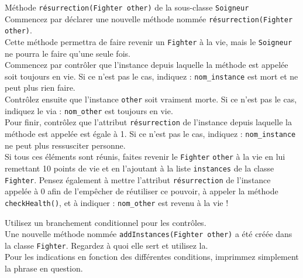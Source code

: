 \begin{Exercice}[10 minutes] Méthode \lstinline{résurrection(Fighter other)} de la sous-classe \lstinline{Soigneur} \\

Commencez par déclarer une nouvelle méthode nommée \lstinline{résurrection(Fighter other)}. \\
Cette méthode permettra de faire revenir un \lstinline{Fighter} à la vie, mais le \lstinline{Soigneur} ne pourra le faire qu'une seule fois. \\

Commencez par contrôler que l'instance depuis laquelle la méthode est appelée soit toujours en vie. Si ce n'est pas le cas, indiquez : \lstinline{nom_instance} est mort et ne peut plus rien faire.  \\ 

Contrôlez ensuite que l'instance \lstinline{other} soit vraiment morte. Si ce n'est pas le cas, indiquez le via : \lstinline{nom_other} est toujours en vie. \\

Pour finir, contrôlez que l'attribut \lstinline{résurrection} de l'instance depuis laquelle la méthode est appelée est égale à 1. Si ce n'est pas le cas, indiquez : \lstinline{nom_instance} ne peut plus ressusciter personne.\\

Si tous ces éléments sont réunis, faites revenir le \lstinline{Fighter} \lstinline{other} à la vie en lui remettant 10 points de vie et en l'ajoutant à la liste \lstinline{instances} de la classe \lstinline{Fighter}. Pensez également à mettre l'attribut \lstinline{résurrection} de l'instance appelée à   
0 afin de l'empêcher de réutiliser ce pouvoir, à appeler la méthode \lstinline{checkHealth()}, et à indiquer : \lstinline{nom_other} est revenu à la vie ! \\

\begin{conseil}
Utilisez un branchement conditionnel pour les contrôles. \\

Une nouvelle méthode nommée \lstinline{addInstances(Fighter other)} a été créée dans la classe \lstinline{Fighter}. Regardez à quoi elle sert et utilisez la. \\

Pour les indications en fonction des différentes conditions, imprimmez simplement la phrase en question. \\
\end{conseil}

\begin{solution}
	
\end{solution}

\end{Exercice}

